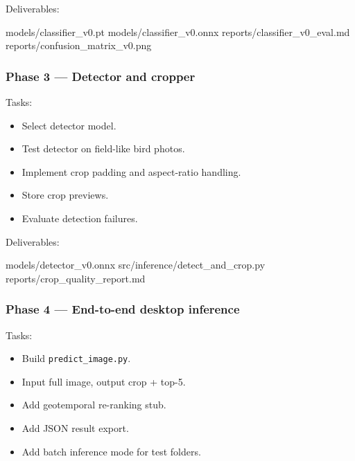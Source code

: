 \documentclass[
  11pt,
]{article}
\newenvironment{Shaded}{}{}
\newcommand{\NormalTok}[1]{#1}
\providecommand{\tightlist}{%
  \setlength{\itemsep}{0pt}\setlength{\parskip}{0pt}}
\begin{document}
Deliverables:

\begin{Shaded}
\begin{Highlighting}[]
\NormalTok{models/classifier\_v0.pt}
\NormalTok{models/classifier\_v0.onnx}
\NormalTok{reports/classifier\_v0\_eval.md}
\NormalTok{reports/confusion\_matrix\_v0.png}
\end{Highlighting}
\end{Shaded}

\subsubsection{Phase 3 --- Detector and
cropper}\label{phase-3-detector-and-cropper}

Tasks:

\begin{itemize}
\tightlist
\item[$\square$]
  Select detector model.
\item[$\square$]
  Test detector on field-like bird photos.
\item[$\square$]
  Implement crop padding and aspect-ratio handling.
\item[$\square$]
  Store crop previews.
\item[$\square$]
  Evaluate detection failures.
\end{itemize}

Deliverables:

\begin{Shaded}
\begin{Highlighting}[]
\NormalTok{models/detector\_v0.onnx}
\NormalTok{src/inference/detect\_and\_crop.py}
\NormalTok{reports/crop\_quality\_report.md}
\end{Highlighting}
\end{Shaded}

\subsubsection{Phase 4 --- End-to-end desktop
inference}\label{phase-4-end-to-end-desktop-inference}

Tasks:

\begin{itemize}
\tightlist
\item[$\square$]
  Build \texttt{predict\_image.py}.
\item[$\square$]
  Input full image, output crop + top-5.
\item[$\square$]
  Add geotemporal re-ranking stub.
\item[$\square$]
  Add JSON result export.
\item[$\square$]
  Add batch inference mode for test folders.
\end{itemize}
\end{document}
